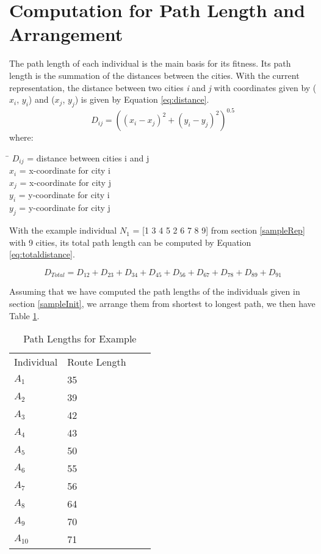 \section{Computation for Path Length and Arrangement}
\indent \indent The path length of each individual is the main basis for its fitness. Its path length is the summation of the distances between the cities. With the current representation, the distance between two cities \emph{i} and \emph{j} with coordinates given by (\emph{$x_i$}, \emph{$y_i$}) and (\emph{$x_j$}, \emph{$y_j$}) is given by Equation \ref{eq:distance}.
\begin{equation}
	\label{eq:distance}
	D_{ij} = ((x_i - x_j)^2 + (y_i - y_j)^2)^{0.5}
\end{equation}
where:
\begin{tabbing}
	\= \kill
	$D_{ij}$\> = distance between cities i and j\\
	$x_i$\> = x-coordinate for city i\\
	$x_j$\> = x-coordinate for city j\\
	$y_i$\> = y-coordinate for city i\\
	$y_j$\> = y-coordinate for city j\\
\end{tabbing}

With the example individual $N_1$ = [1 3 4 5 2 6 7 8 9] from section \ref{sampleRep} with 9 cities, its total path length can be computed by Equation \ref{eq:totaldistance}.

\begin{equation}
	\label{eq:totaldistance}
	D_{Total} = D_{12} + D_{23} + D_{34} + D_{45} + D_{56} + D_{67} + D_{78} + D_{89} + D_{91} 
\end{equation}

Assuming that we have computed the path lengths of the individuals given in section \ref{sampleInit}, we arrange them from shortest to longest path, we then have Table \ref{table:orderPath}.

\begin{table}[H]
	\begin{center}
		\begin{tabular}{llll}
			Individual & Route Length  \\
			$A_{1}$         & 35    \\
			$A_{2}$         & 39    \\
			$A_{3}$          & 42   \\
			$A_{4}$          & 43   \\
			$A_{5}$         & 50    \\
			$A_{6}$          & 55   \\
			$A_{7}$          & 56   \\
			$A_{8}$          & 64   \\
			$A_{9}$          & 70   \\
			$A_{10}$         & 71                          
		\end{tabular}
		\caption{Path Lengths for Example}
		\label{table:orderPath}
	\end{center}
\end{table}

